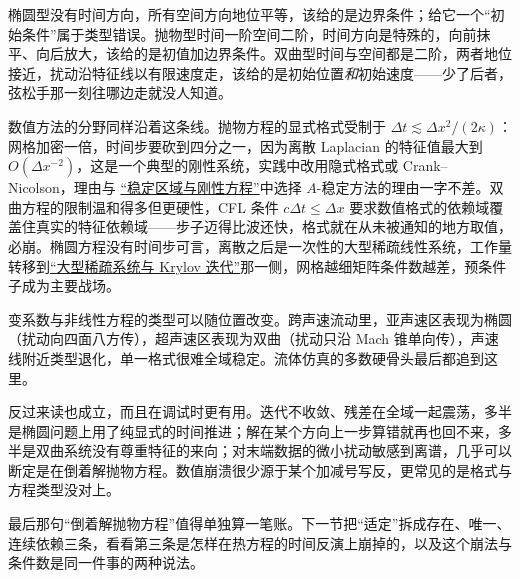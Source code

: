 椭圆型没有时间方向，所有空间方向地位平等，该给的是边界条件；给它一个``初始条件''属于类型错误。抛物型时间一阶空间二阶，时间方向是特殊的，向前抹平、向后放大，该给的是初值加边界条件。双曲型时间与空间都是二阶，两者地位接近，扰动沿特征线以有限速度走，该给的是初始位置\emph{和}初始速度——少了后者，弦松手那一刻往哪边走就没人知道。

数值方法的分野同样沿着这条线。抛物方程的显式格式受制于 \(\Delta t\lesssim\Delta x^2/(2\kappa)\)：网格加密一倍，时间步要砍到四分之一，因为离散 Laplacian 的特征值最大到 \(O(\Delta x^{-2})\)，这是一个典型的刚性系统，实践中改用隐式格式或 Crank--Nicolson，理由与 \hyperref[sec:08-Numerical-Analysis/06-ODE/03]{``稳定区域与刚性方程''}中选择 \(A\)-稳定方法的理由一字不差。双曲方程的限制温和得多但更硬性，CFL 条件 \(c\Delta t\le\Delta x\) 要求数值格式的依赖域覆盖住真实的特征依赖域——步子迈得比波还快，格式就在从未被通知的地方取值，必崩。椭圆方程没有时间步可言，离散之后是一次性的大型稀疏线性系统，工作量转移到\hyperref[sec:08-Numerical-Analysis/05-Numerical-Linear-Algebra/04]{``大型稀疏系统与 Krylov 迭代''}那一侧，网格越细矩阵条件数越差，预条件子成为主要战场。

变系数与非线性方程的类型可以随位置改变。跨声速流动里，亚声速区表现为椭圆（扰动向四面八方传），超声速区表现为双曲（扰动只沿 Mach 锥单向传），声速线附近类型退化，单一格式很难全域稳定。流体仿真的多数硬骨头最后都追到这里。

反过来读也成立，而且在调试时更有用。迭代不收敛、残差在全域一起震荡，多半是椭圆问题上用了纯显式的时间推进；解在某个方向上一步算错就再也回不来，多半是双曲系统没有尊重特征的来向；对末端数据的微小扰动敏感到离谱，几乎可以断定是在倒着解抛物方程。数值崩溃很少源于某个加减号写反，更常见的是格式与方程类型没对上。

最后那句``倒着解抛物方程''值得单独算一笔账。下一节把``适定''拆成存在、唯一、连续依赖三条，看看第三条是怎样在热方程的时间反演上崩掉的，以及这个崩法与条件数是同一件事的两种说法。
